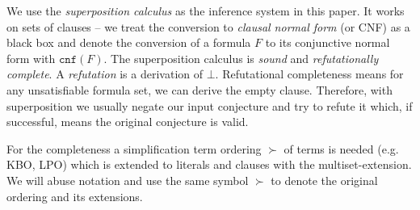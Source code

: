 We use the \textit{superposition calculus} as the inference system in this paper. It works on sets of clauses -- we treat the conversion to \textit{clausal normal form} (or CNF) as a black box \cite{vcnf} and denote the conversion of a formula $F$ to its conjunctive normal form with $\mathtt{cnf}(F)$. The superposition calculus is \textit{sound} and \textit{refutationally complete}. A \textit{refutation} is a derivation of $\bot$. Refutational completeness means for any unsatisfiable formula set, we can derive the empty clause. Therefore, with superposition we usually negate our input conjecture and try to refute it which, if successful, means the original conjecture is valid.

For the completeness a simplification term ordering $\succ$ of terms is needed (e.g. KBO, LPO) which is extended to literals and clauses with the multiset-extension. We will abuse notation and use the same symbol $\succ$ to denote the original ordering and its extensions.
